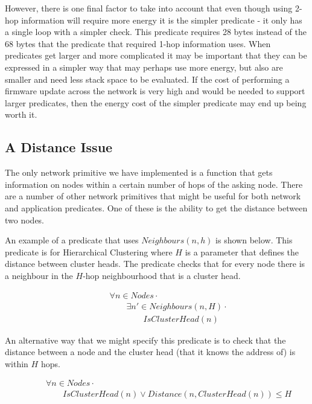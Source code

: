 However, there is one final factor to take into account that even though using 2-hop information will require more energy it is the simpler predicate - it only has a single loop with a simpler check. This predicate requires 28 bytes instead of the 68 bytes that the predicate that required 1-hop information uses. When predicates get larger and more complicated it may be important that they can be expressed in a simpler way that may perhaps use more energy, but also are smaller and need less stack space to be evaluated. If the cost of performing a firmware update across the network is very high and would be needed to support larger predicates, then the energy cost of the simpler predicate may end up being worth it.

\subsection{A Distance Issue}


The only network primitive we have implemented is a function that gets information on nodes within a certain number of hops of the asking node. There are a number of other network primitives that might be useful for both network and application predicates. One of these is the ability to get the distance between two nodes.

An example of a predicate that uses $Neighbours(n, h)$ is shown below. This predicate is for Hierarchical Clustering where $H$ is a parameter that defines the distance between cluster heads. The predicate checks that for every node there is a neighbour in the $H$-hop neighbourhood that is a cluster head.

\begin{align*}
& \hspace{2em}	\forall n \in Nodes \cdot \\
& \hspace{4em}		\exists n' \in Neighbours(n, H) \cdot \\
& \hspace{6em}			IsClusterHead(n)
\end{align*}

An alternative way that we might specify this predicate is to check that the distance between a node and the cluster head (that it knows the address of) is within $H$ hops.

\begin{align*}
& \hspace{2em}	\forall n \in Nodes \cdot \\
& \hspace{4em}		IsClusterHead(n) \lor Distance(n, ClusterHead(n)) \leq H
\end{align*}

